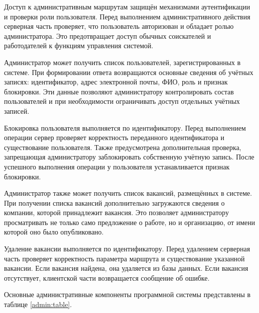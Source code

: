 Доступ к административным маршрутам защищён механизмами аутентификации и проверки роли пользователя. Перед выполнением административного действия серверная часть проверяет, что пользователь авторизован и обладает ролью администратора. Это предотвращает доступ обычных соискателей и работодателей к функциям управления системой.

Администратор может получить список пользователей, зарегистрированных в системе. При формировании ответа возвращаются основные сведения об учётных записях: идентификатор, адрес электронной почты, ФИО, роль и признак блокировки. Эти данные позволяют администратору контролировать состав пользователей и при необходимости ограничивать доступ отдельных учётных записей.

Блокировка пользователя выполняется по идентификатору. Перед выполнением операции сервер проверяет корректность переданного идентификатора и существование пользователя. Также предусмотрена дополнительная проверка, запрещающая администратору заблокировать собственную учётную запись. После успешного выполнения операции у пользователя устанавливается признак блокировки.

Администратор также может получить список вакансий, размещённых в системе. При получении списка вакансий дополнительно загружаются сведения о компании, которой принадлежит вакансия. Это позволяет администратору просматривать не только само предложение о работе, но и организацию, от имени которой оно было опубликовано.

Удаление вакансии выполняется по идентификатору. Перед удалением серверная часть проверяет корректность параметра маршрута и существование указанной вакансии. Если вакансия найдена, она удаляется из базы данных. Если вакансия отсутствует, клиентской части возвращается сообщение об ошибке.

Основные административные компоненты программной системы представлены в таблице \ref{admin:table}.

